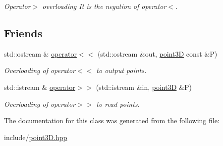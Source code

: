 \begin{DoxyCompactItemize}
\begin{DoxyCompactList}\small\item\em Operator$>$ overloading  It is the negation of operator$<$. \item\end{DoxyCompactList}\end{DoxyCompactItemize}
\subsection*{Friends}
\begin{DoxyCompactItemize}
\item 
\hypertarget{classpoint3D_a13f42ad853763f2663fb02d7b379e7ef}{
std::ostream \& \hyperlink{classpoint3D_a13f42ad853763f2663fb02d7b379e7ef}{operator$<$$<$} (std::ostream \&out, \hyperlink{classpoint3D}{point3D} const \&P)}
\label{classpoint3D_a13f42ad853763f2663fb02d7b379e7ef}

\begin{DoxyCompactList}\small\item\em Overloading of operator$<$$<$ to output points. \item\end{DoxyCompactList}\item 
\hypertarget{classpoint3D_a2373eab0e99093442b25477d691ec8b8}{
std::istream \& \hyperlink{classpoint3D_a2373eab0e99093442b25477d691ec8b8}{operator$>$$>$} (std::istream \&in, \hyperlink{classpoint3D}{point3D} \&P)}
\label{classpoint3D_a2373eab0e99093442b25477d691ec8b8}

\begin{DoxyCompactList}\small\item\em Overloading of operator$>$$>$ to read points. \item\end{DoxyCompactList}\end{DoxyCompactItemize}


The documentation for this class was generated from the following file:\begin{DoxyCompactItemize}
\item 
include/\hyperlink{point3D_8hpp}{point3D.hpp}\end{DoxyCompactItemize}
